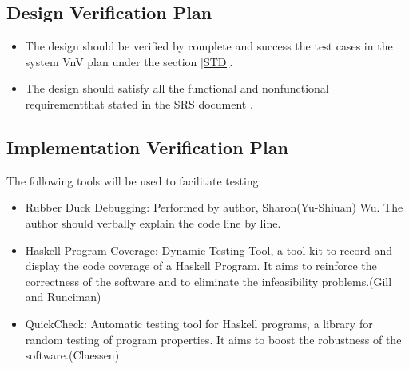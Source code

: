 \documentclass[12pt, titlepage]{article}
\begin{document}

\subsection{Design Verification Plan}
\begin{itemize}

\item The design should be verified by complete and success the test cases in
the system VnV plan under the section \ref{STD}.
\item The design should satisfy all the functional and nonfunctional
requirementthat stated in the SRS document \cite{YS2019}.

\end{itemize}

\label{Planfordv}

\subsection{Implementation Verification Plan} 
The following tools will be used to facilitate testing: 

\begin{itemize}
\item[ ]Rubber Duck Debugging: Performed by author, Sharon(Yu-Shiuan) Wu. The 
author should verbally explain the code line by line.
\item[ ]Haskell Program Coverage: Dynamic Testing Tool, a tool-kit to record 
and display the code coverage of a Haskell Program. It aims to reinforce the 
correctness of the software and to eliminate the infeasibility problems.(Gill
and Runciman\cite{GillandRunciman})
\item[ ]QuickCheck: Automatic testing tool for Haskell programs, a library for
random testing of program properties. It aims to boost the robustness of the 
software.(Claessen\cite{QuickCheck})
		
\end{itemize} 

 
\end{document}
